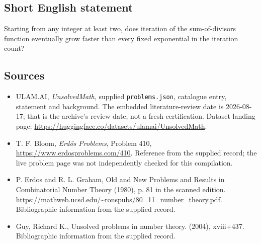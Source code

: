 \documentclass[11pt,a4paper]{article}
\begin{document}
\subsection{Short English statement}

Starting from any integer at least two, does iteration of the sum-of-divisors function eventually grow faster than every fixed exponential in the iteration count?

\subsection{Sources}

{\small

\begin{itemize}

\item[\hypertarget{source:statement:1}{S1}] ULAM.AI, \emph{UnsolvedMath}, supplied \texttt{problems.json}, catalogue entry, statement and background. The embedded literature-review date is 2026-08-17; that is the archive’s review date, not a fresh certification. Dataset landing page: \url{https://huggingface.co/datasets/ulamai/UnsolvedMath}.

\item[\hypertarget{source:statement:2}{S2}] T. F. Bloom, \emph{Erdős Problems}, Problem 410, \url{https://www.erdosproblems.com/410}. Reference from the supplied record; the live problem page was not independently checked for this compilation.

\item[\hypertarget{source:statement:3}{S3}] P. Erdos and R. L. Graham, Old and New Problems and Results in Combinatorial Number Theory (1980), p. 81 in the scanned edition. \url{https://mathweb.ucsd.edu/~ronspubs/80_11_number_theory.pdf}. Bibliographic information from the supplied record.

\item[\hypertarget{source:statement:4}{S4}] Guy, Richard K., Unsolved problems in number theory. (2004), xviii+437. Bibliographic information from the supplied record.

\end{itemize}

}

\label{end:statement}
\end{document}
